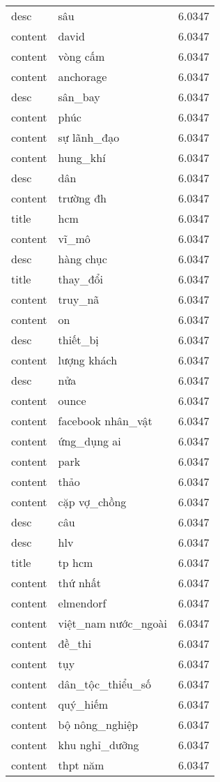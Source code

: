 \documentclass{article}
\begin{document}
\begin{tabular}{lll}
desc & sâu & 6.0347\\
content & david & 6.0347\\
content & vòng cấm & 6.0347\\
content & anchorage & 6.0347\\
desc & sân\_bay & 6.0347\\
content & phúc & 6.0347\\
content & sự lãnh\_đạo & 6.0347\\
content & hung\_khí & 6.0347\\
desc & dân & 6.0347\\
content & trường đh & 6.0347\\
title & hcm & 6.0347\\
content & vĩ\_mô & 6.0347\\
desc & hàng chục & 6.0347\\
title & thay\_đổi & 6.0347\\
content & truy\_nã & 6.0347\\
content & on & 6.0347\\
desc & thiết\_bị & 6.0347\\
content & lượng khách & 6.0347\\
desc & nửa & 6.0347\\
content & ounce & 6.0347\\
content & facebook nhân\_vật & 6.0347\\
content & ứng\_dụng ai & 6.0347\\
content & park & 6.0347\\
content & thảo & 6.0347\\
content & cặp vợ\_chồng & 6.0347\\
desc & câu & 6.0347\\
desc & hlv & 6.0347\\
title & tp hcm & 6.0347\\
content & thứ nhất & 6.0347\\
content & elmendorf & 6.0347\\
content & việt\_nam nước\_ngoài & 6.0347\\
content & đề\_thi & 6.0347\\
content & tụy & 6.0347\\
content & dân\_tộc\_thiểu\_số & 6.0347\\
content & quý\_hiếm & 6.0347\\
content & bộ nông\_nghiệp & 6.0347\\
content & khu nghỉ\_dưỡng & 6.0347\\
content & thpt năm & 6.0347\\

\end{tabular}
\end{document}
